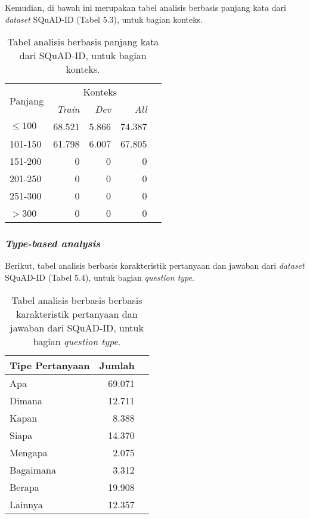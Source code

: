 Kemudian, di bawah ini merupakan tabel analisis berbasis panjang kata dari \emph{dataset} SQuAD-ID (Tabel 5.3), untuk bagian konteks.

\begin{table}[H]\centering
\begin{tabular}{lrrrr}\toprule
\multirow{2}{*}{Panjang} &\multicolumn{3}{c}{Konteks} \\\cmidrule{2-4}
&\emph{Train} &\emph{Dev} &\emph{All} \\\midrule
$\leq100$ &68.521 &5.866 &74.387 \\
101-150 &61.798 &6.007 &67.805 \\
151-200 &0 &0 &0 \\
201-250 &0 &0 &0 \\
251-300 &0 &0 &0 \\
$>$300 &0 &0 &0 \\
\bottomrule
\end{tabular}
\caption{Tabel analisis berbasis panjang kata dari SQuAD-ID, untuk bagian konteks.}
\end{table}

\subsubsection{\emph{Type-based analysis}}
Berikut, tabel analisis berbasis karakteristik pertanyaan dan jawaban dari \emph{dataset} SQuAD-ID (Tabel 5.4), untuk bagian \emph{question type}.

\begin{table}[H]\centering
\begin{tabular}{lrr}\toprule
Tipe Pertanyaan &Jumlah \\\midrule
Apa &69.071 \\
Dimana &12.711 \\
Kapan &8.388 \\
Siapa &14.370 \\
Mengapa &2.075 \\
Bagaimana &3.312 \\
Berapa &19.908 \\
Lainnya &12.357 \\
\bottomrule
\end{tabular}
\caption{Tabel analisis berbasis berbasis karakteristik pertanyaan dan jawaban dari SQuAD-ID, untuk bagian \emph{question type}.}
\end{table}

